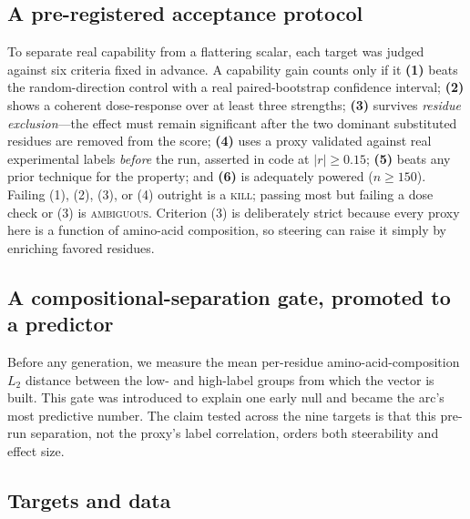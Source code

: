 \documentclass{article}
\begin{document}
\subsection{A pre-registered acceptance protocol}

To separate real capability from a flattering scalar, each target was judged
against six criteria fixed in advance. A capability gain counts only if it
\textbf{(1)} beats the random-direction control with a real paired-bootstrap
confidence interval; \textbf{(2)} shows a coherent dose-response over at least
three strengths; \textbf{(3)} survives \emph{residue exclusion}---the effect
must remain significant after the two dominant substituted residues are removed
from the score; \textbf{(4)} uses a proxy validated against real experimental
labels \emph{before} the run, asserted in code at $|r|\!\ge\!0.15$;
\textbf{(5)} beats any prior technique for the property; and \textbf{(6)} is
adequately powered ($n\!\ge\!150$). Failing (1), (2), (3), or (4) outright is a
\textsc{kill}; passing most but failing a dose check or (3) is
\textsc{ambiguous}. Criterion (3) is deliberately strict because every proxy
here is a function of amino-acid composition, so steering can raise it simply by
enriching favored residues.

\subsection{A compositional-separation gate, promoted to a predictor}

Before any generation, we measure the mean per-residue amino-acid-composition
$L_2$ distance between the low- and high-label groups from which the vector is
built. This gate was introduced to explain one early null and became the arc's
most predictive number. The claim tested across the nine targets is that this
pre-run separation, not the proxy's label correlation, orders both
steerability and effect size.

\subsection{Targets and data}
\end{document}
